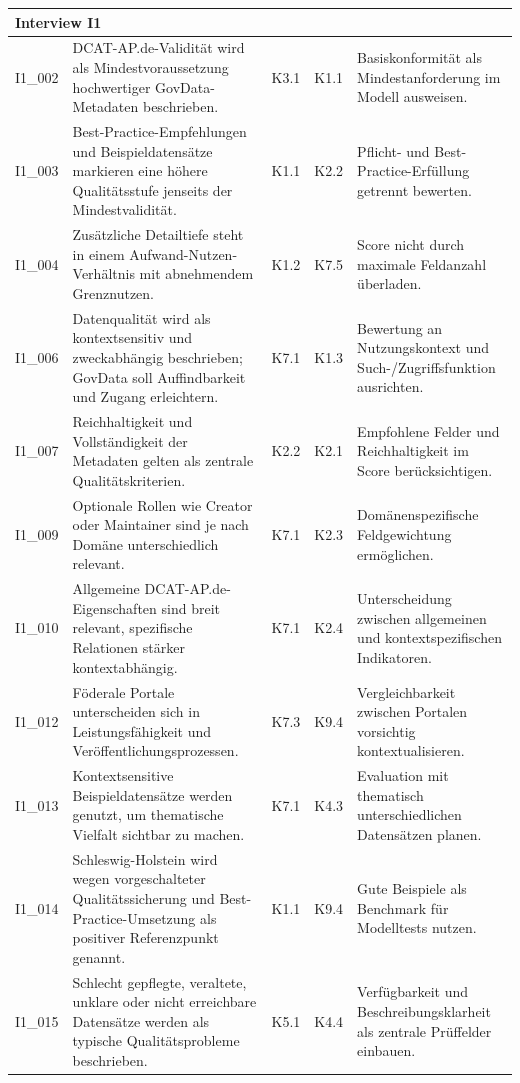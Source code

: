 \begin{longtable}{p{0.9cm} p{6cm} p{0.9cm} p{0.9cm} p{6cm}}
\multicolumn{5}{l}{\textbf{Interview I1}} \\
\midrule
I1\_002 & DCAT-AP.de-Validität wird als Mindestvoraussetzung hochwertiger GovData-Metadaten beschrieben. & K3.1 & K1.1 & Basiskonformität als Mindestanforderung im Modell ausweisen. \\
I1\_003 & Best-Practice-Empfehlungen und Beispieldatensätze markieren eine höhere Qualitätsstufe jenseits der Mindestvalidität. & K1.1 & K2.2 & Pflicht- und Best-Practice-Erfüllung getrennt bewerten. \\
I1\_004 & Zusätzliche Detailtiefe steht in einem Aufwand-Nutzen-Verhältnis mit abnehmendem Grenznutzen. & K1.2 & K7.5 & Score nicht durch maximale Feldanzahl überladen. \\
I1\_006 & Datenqualität wird als kontextsensitiv und zweckabhängig beschrieben; GovData soll Auffindbarkeit und Zugang erleichtern. & K7.1 & K1.3 & Bewertung an Nutzungskontext und Such-/Zugriffsfunktion ausrichten. \\
I1\_007 & Reichhaltigkeit und Vollständigkeit der Metadaten gelten als zentrale Qualitätskriterien. & K2.2 & K2.1 & Empfohlene Felder und Reichhaltigkeit im Score berücksichtigen. \\
I1\_009 & Optionale Rollen wie Creator oder Maintainer sind je nach Domäne unterschiedlich relevant. & K7.1 & K2.3 & Domänenspezifische Feldgewichtung ermöglichen. \\
I1\_010 & Allgemeine DCAT-AP.de-Eigenschaften sind breit relevant, spezifische Relationen stärker kontextabhängig. & K7.1 & K2.4 & Unterscheidung zwischen allgemeinen und kontextspezifischen Indikatoren. \\
I1\_012 & Föderale Portale unterscheiden sich in Leistungsfähigkeit und Veröffentlichungsprozessen. & K7.3 & K9.4 & Vergleichbarkeit zwischen Portalen vorsichtig kontextualisieren. \\
I1\_013 & Kontextsensitive Beispieldatensätze werden genutzt, um thematische Vielfalt sichtbar zu machen. & K7.1 & K4.3 & Evaluation mit thematisch unterschiedlichen Datensätzen planen. \\
I1\_014 & Schleswig-Holstein wird wegen vorgeschalteter Qualitätssicherung und Best-Practice-Umsetzung als positiver Referenzpunkt genannt. & K1.1 & K9.4 & Gute Beispiele als Benchmark für Modelltests nutzen. \\
I1\_015 & Schlecht gepflegte, veraltete, unklare oder nicht erreichbare Datensätze werden als typische Qualitätsprobleme beschrieben. & K5.1 & K4.4 & Verfügbarkeit und Beschreibungsklarheit als zentrale Prüffelder einbauen. \\

\end{longtable}
